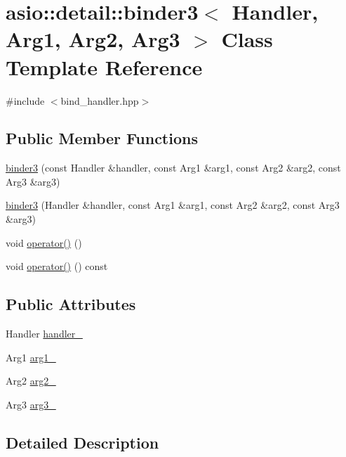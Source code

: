 \hypertarget{classasio_1_1detail_1_1binder3}{}\section{asio\+:\+:detail\+:\+:binder3$<$ Handler, Arg1, Arg2, Arg3 $>$ Class Template Reference}
\label{classasio_1_1detail_1_1binder3}


{\ttfamily \#include $<$bind\+\_\+handler.\+hpp$>$}

\subsection*{Public Member Functions}
\begin{DoxyCompactItemize}
\item 
\hyperlink{classasio_1_1detail_1_1binder3_a716841b9eccbec259f19d21bbadaf1a8}{binder3} (const Handler \&handler, const Arg1 \&arg1, const Arg2 \&arg2, const Arg3 \&arg3)
\item 
\hyperlink{classasio_1_1detail_1_1binder3_aba9f817b5dd22e764115577e957a5dd9}{binder3} (Handler \&handler, const Arg1 \&arg1, const Arg2 \&arg2, const Arg3 \&arg3)
\item 
void \hyperlink{classasio_1_1detail_1_1binder3_a16d3bdfdfc892d6957d03e7b8011c280}{operator()} ()
\item 
void \hyperlink{classasio_1_1detail_1_1binder3_a4cad850b9e7af8b103c6d62824ef894b}{operator()} () const 
\end{DoxyCompactItemize}
\subsection*{Public Attributes}
\begin{DoxyCompactItemize}
\item 
Handler \hyperlink{classasio_1_1detail_1_1binder3_a7f163de06caa7421ffc36ba2f3a2c26b}{handler\+\_\+}
\item 
Arg1 \hyperlink{classasio_1_1detail_1_1binder3_a493903bcead79f7229b104bfb46e854e}{arg1\+\_\+}
\item 
Arg2 \hyperlink{classasio_1_1detail_1_1binder3_a71664a34f2a1f6adf06c72bc9c22da5a}{arg2\+\_\+}
\item 
Arg3 \hyperlink{classasio_1_1detail_1_1binder3_af73059f968a08758b444c1b9260aa24a}{arg3\+\_\+}
\end{DoxyCompactItemize}


\subsection{Detailed Description}
